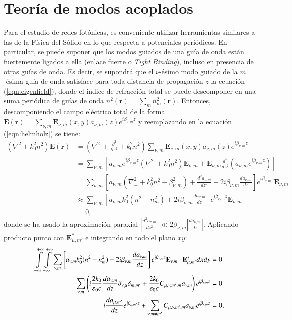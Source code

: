 \section{Teoría de modos acoplados}
	Para el estudio de redes fotónicas, es conveniente utilizar herramientas similares a las de la Física del Sólido en lo que respecta a potenciales periódicos. En particular, se puede suponer que los modos guiados de una guía de onda están fuertemente ligados a ella (enlace fuerte o \textit{Tight Binding}), incluso en presencia de otras guías de onda. Es decir, se supondrá que el $\nu$-ésimo modo guiado de la $m$-ésima guía de onda satisface para toda distancia de propagación $z$ la ecuación (\ref{eqn:eigenfield}), donde el índice de refracción total se puede descomponer en una suma periódica de guías de onda $n^2(\textbf{r}) = \sum_{m} n^2_m(\textbf{r})$. Entonces, descomponiendo el campo eléctrico total de la forma $\textbf{E}(\textbf{r}) = \sum_{\nu, m} \textbf{E}_{\nu, m}(x, y) a_{\nu, m}(z) e^{i\beta_{\nu, m} z}$ y reemplazando en la ecuación (\ref{eqn:helmholz}) se tiene:
\begin{align}
	(\nabla^2  + k_0^2n^2) \textbf{E}(\textbf{r}) &= \left(\nabla_\perp^2 + \frac{\partial^2}{\partial z^2} + k_0^2n^2 \right)\sum_{\nu, m} \textbf{E}_{\nu, m}(x, y) a_{\nu, m}(z) e^{i\beta_{\nu, m} z}
	\nonumber
	\\
	&= \sum_{\nu, m} \left[a_{\nu, m} e^{i\beta_{\nu, m} z} \left(\nabla_\perp^2 +k_0^2n^2 \right)\textbf{E}_{\nu, m} + \textbf{E}_{\nu, m}\frac{d^2}{d z^2}\left(a_{\nu, m} e^{i\beta_{\nu, m} z}\right)\right]
	\nonumber	
	\\
	&= \sum_{\nu, m} \left[a_{\nu, m}  \left(\nabla_\perp^2 +k_0^2n^2 -\beta_{\nu,m}^2 \right) + \frac{d^2 a_{\nu, m}}{d z^2}  +2i\beta_{\nu,m}\frac{d a_{\nu, m}}{d z} \right]e^{i\beta_{\nu, m} z}\textbf{E}_{\nu, m}
		\nonumber	
	\\
	&\approx \sum_{\nu, m} \left[a_{\nu, m}  k_0^2(n^2 - n^2_{m}) +2i\beta_{\nu,m}\frac{d a_{\nu, m}}{d z} \right]e^{i\beta_{\nu, m} z}\textbf{E}_{\nu, m}
	\nonumber	
	\\
	&= 0,
	\nonumber	
\end{align}
donde se ha usado la aproximación paraxial $\left|\frac{d^2 a_{\nu, m}}{d z^2}\right|\ll 2\beta_{\nu,m}\left|\frac{d a_{\nu, m}}{d z}\right|  $. Aplicando producto punto con $\textbf{E}_{\mu, m'}^*$ e integrando en todo el plano $xy$:
\begin{align}
	  \int\displaylimits_{-\infty}^{+\infty}\int\displaylimits_{-\infty}^{+\infty} \sum_{\nu, m} \left[a_{\nu, m}  k_0^2(n^2 - n^2_{m}) +2i\beta_{\nu,m}\frac{d a_{\nu, m}}{d z} \right]e^{i\beta_{\nu, m} z}\textbf{E}_{\nu, m} \cdot \textbf{E}_{\mu, m'}^* dxdy &= 0
	  \nonumber
	  \\
	  \sum_{\nu, m} \left(i\frac{2k_0}{\epsilon_0 c}\frac{d a_{\nu, m}}{d z} \delta_{\nu,\mu}\delta_{m,m'} +  \frac{2k_0}{\epsilon_0 c}C_{\mu, \nu, m', m}   a_{\nu, m} \right)e^{i\beta_{\nu, m} z} &= 0
	  \nonumber
	  \\
	  	  i\frac{d a_{\mu, m'}}{d z} e^{i\beta_{\mu, m'} z} +  \sum_{\nu, m\neq m'}C_{\mu, \nu, m', m}   a_{\nu, m} e^{i\beta_{\nu, m} z} &= 0,
	  	  \nonumber
\end{align}
